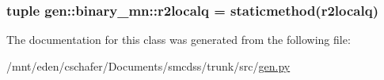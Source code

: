 \hypertarget{classgen_1_1binary__mn_a3e93467420a3516765e31ecd164808f}{
\subsubsection[{R}]{}}
\label{classgen_1_1binary__mn_a3e93467420a3516765e31ecd164808f}


\hypertarget{classgen_1_1binary__mn_e27aacf71cc73e5a334eb14344706ddc}{
\subsubsection[{r2localq}]{\setlength{\rightskip}{0pt plus 5cm}tuple {\bf gen::binary\_\-mn::r2localq} = staticmethod({\bf r2localq})}}
\label{classgen_1_1binary__mn_e27aacf71cc73e5a334eb14344706ddc}




The documentation for this class was generated from the following file:\begin{CompactItemize}
\item 
/mnt/eden/cschafer/Documents/smcdss/trunk/src/\hyperlink{gen_8py}{gen.py}\end{CompactItemize}
